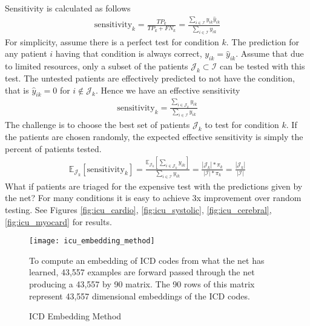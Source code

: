 Sensitivity is calculated as follows
\begin{gather}
    \text{sensitivity}_k 
        = \frac{TP_k}{TP_k + FN_k}
        = \frac
            {\sum_{i \in \mathcal{I}} y_{ik} \hat{y}_{ik}}
            {\sum_{i \in \mathcal{I}} y_{ik}}
\end{gather}
For simplicity, assume there is a perfect test for condition $k$.  The prediction for any patient $i$ having that condition is always correct, $y_{ik} = \hat{y}_{ik}$.  Assume that due to limited resources, only a subset of the patients $\mathcal{J}_k \subset \mathcal{I}$ can be tested with this test. The untested patients are effectively predicted to not have the condition, that is $\hat{y}_{ik} = 0$ for $i \notin \mathcal{J}_k$.  Hence we have an effective sensitivity
\begin{gather}
    \text{sensitivity}_k = \frac
        {\sum_{i \in \mathcal{J}_k} y_{ik}}
        {\sum_{i \in \mathcal{I}} y_{ik}}
\end{gather}
The challenge is to choose the best set of patients $\mathcal{J}_k$ to test for condition $k$.  If the patients are chosen randomly, the expected effective sensitivity is simply the percent of patients tested.
\begin{gather}
    \mathbb{E}_{\mathcal{J}_k}[\text{sensitivity}_k]
        = \frac
            {\mathbb{E}_{\mathcal{J}_k}[\sum_{i \in \mathcal{J}_k} y_{ik}]}
            {\sum_{i \in \mathcal{I}} y_{ik}}
        = \frac{|\mathcal{J}_k| * \pi_k}{|\mathcal{I}| * \pi_k} 
        = \frac{|\mathcal{J}_k|}{|\mathcal{I}|} 
\end{gather}
What if patients are triaged for the expensive test with the predictions given by the net?  For many conditions it is easy to achieve 3x improvement over random testing.  See Figures \ref{fig:icu_cardio}, \ref{fig:icu_systolic}, \ref{fig:icu_cerebral}, \ref{fig:icu_myocard} for results.

\pagebreak
\begin{figure}[h]
\begin{center}
\texttt{[image: icu\_embedding\_method]}
\end{center}
\caption{ICD Embedding Method}
\vspace{12px}
To compute an embedding of ICD codes from what the net has learned, 43,557 examples are forward passed through the net producing a 43,557 by 90 matrix.  The 90 rows of this matrix represent 43,557 dimensional embeddings of the ICD codes.
\label{fig:icu_embedding_method}
\end{figure}

